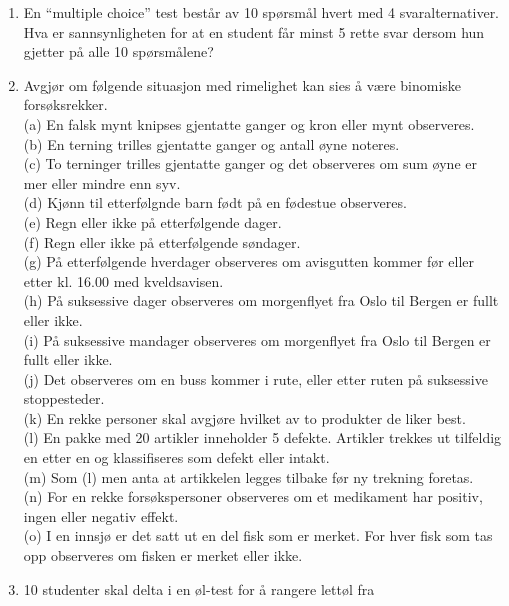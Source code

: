 \begin{enumerate}
\item  En ``multiple choice'' test består av 10 spørsmål hvert med
     4 svaralternativer. Hva er sannsynligheten for at en student
     får minst 5 rette svar dersom hun gjetter på alle 10
     spørsmålene?

\item Avgjør om følgende situasjon med rimelighet kan sies å være
     binomiske forsøksrekker. \\
     (a)  En falsk mynt knipses gjentatte ganger og kron eller   
       mynt observeres.\\
     (b)  En terning trilles gjentatte ganger og antall øyne     
     noteres.\\
     (c)  To terninger trilles gjentatte ganger og det observeres
          om sum øyne er mer eller mindre enn syv.\\
     (d)  Kjønn til etterfølgnde barn født på en fødestue     
     observeres.\\
     (e)  Regn eller ikke på etterfølgende dager.\\
     (f)  Regn eller ikke på etterfølgende søndager.\\
     (g)  På etterfølgende hverdager observeres om avisgutten    
      kommer før eller etter kl. 16.00 med kveldsavisen.\\
     (h)  På suksessive dager observeres om morgenflyet fra Oslo
          til Bergen er fullt eller ikke.\\
     (i)  På suksessive mandager observeres om morgenflyet fra    
      Oslo til Bergen er fullt eller ikke.\\
     (j)  Det observeres om en buss kommer i rute, eller etter   
       ruten på suksessive stoppesteder.\\
     (k)  En rekke personer skal avgjøre hvilket av to produkter
          de liker best.\\
     (l)  En pakke med 20 artikler inneholder 5 defekte. Artikler
          trekkes ut tilfeldig en etter en og klassifiseres som  
        defekt eller intakt.\\
     (m)  Som (l) men anta at artikkelen legges tilbake før ny   
       trekning foretas.\\
     (n)  For en rekke forsøkspersoner observeres om et     
     medikament har positiv, ingen eller negativ effekt.\\
     (o)  I en innsjø er det satt ut en del fisk som er merket.  
        For hver fisk som tas opp observeres om fisken er     
     merket eller ikke.
\item 10 studenter skal delta i en øl-test for å rangere lettøl fra

\end{enumerate}

